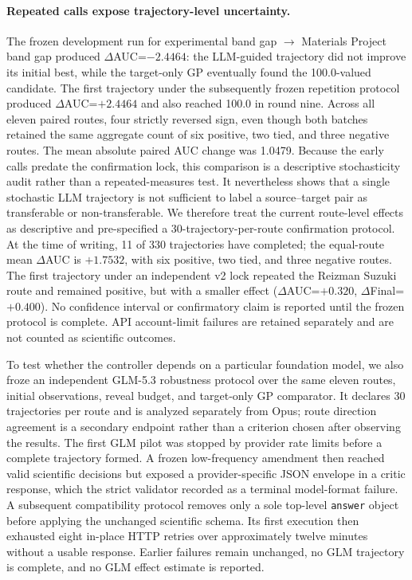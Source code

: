 \paragraph{Repeated calls expose trajectory-level uncertainty.}
The frozen development run for experimental band gap $\rightarrow$ Materials
Project band gap produced $\Delta$AUC=$-2.4464$: the LLM-guided trajectory did
not improve its initial best, while the target-only GP eventually found the
100.0-valued candidate. The first trajectory under the subsequently frozen
repetition protocol produced $\Delta$AUC=$+2.4464$ and also reached 100.0 in
round nine. Across all eleven paired routes, four strictly reversed sign, even
though both batches retained the same aggregate count of six positive, two
tied, and three negative routes. The mean absolute paired AUC change was
1.0479. Because the early calls predate the confirmation lock, this comparison
is a descriptive stochasticity audit rather than a repeated-measures test. It
nevertheless shows that a single stochastic LLM trajectory is not sufficient
to label a source--target pair as transferable or non-transferable. We
therefore treat the current route-level effects as descriptive and
pre-specified a 30-trajectory-per-route confirmation protocol.
At the time of writing, 11 of 330 trajectories have completed; the equal-route
mean $\Delta$AUC is $+1.7532$, with six positive, two tied, and three negative
routes. The first trajectory under an independent v2 lock repeated the Reizman
Suzuki route and remained positive, but with a smaller effect
($\Delta$AUC=$+0.320$, $\Delta$Final=$+0.400$). No confidence interval or
confirmatory claim is reported until the frozen protocol is complete. API
account-limit failures are retained separately and are not counted as
scientific outcomes.

To test whether the controller depends on a particular foundation model, we
also froze an independent GLM-5.3 robustness protocol over the same eleven
routes, initial observations, reveal budget, and target-only GP comparator. It
declares 30 trajectories per route and is analyzed separately from Opus; route
direction agreement is a secondary endpoint rather than a criterion chosen
after observing the results. The first GLM pilot was stopped by provider rate
limits before a complete trajectory formed. A frozen low-frequency amendment
then reached valid scientific decisions but exposed a provider-specific JSON
envelope in a critic response, which the strict validator recorded as a
terminal model-format failure. A subsequent compatibility protocol removes
only a sole top-level \texttt{answer} object before applying the unchanged
scientific schema. Its first execution then exhausted eight in-place HTTP
retries over approximately twelve minutes without a usable response. Earlier
failures remain unchanged, no GLM trajectory is complete, and no GLM effect
estimate is reported.

